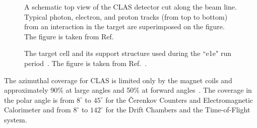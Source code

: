 \clearpage
\begin{figure}[htp]
\begin{center}
\caption{\small A schematic top view of the CLAS detector cut along the beam line. Typical photon, electron, and proton tracks (from top to bottom) from an interaction in the target are superimposed on the figure. The figure is taken from Ref.~\cite{Mecking:2003zu}} \label{fig:clas}
\end{center}
\end{figure}
\begin{figure}[!ht]
\begin{center}
\end{center}
\caption{\small The target cell and its support structure used during the ``e1e" run period~\cite{target}. The figure is taken from Ref.~\cite{Fed_paper_2018}. }\label{fig:e1e_target}
\end{figure}


The azimuthal coverage for CLAS is limited only by the magnet coils and approximately 90\% at large angles and 50\% at forward angles~\cite{Amarian:2001zs}. The coverage in the polar angle is from $8^{\circ}\mathrm{}$ to $45^{\circ}\mathrm{}$ for the \v Cerenkov Counters and Electromagnetic Calorimeter and from $8^{\circ}\mathrm{}$ to $142^{\circ}\mathrm{}$ for the Drift Chambers and the Time-of-Flight system.

